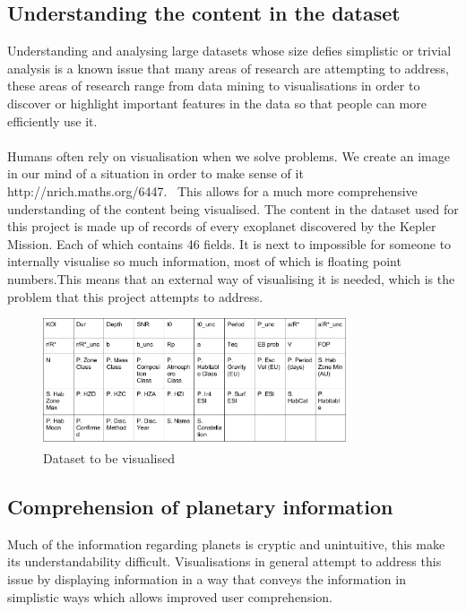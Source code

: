 \subsection{Understanding the content in the dataset}
Understanding and analysing large datasets whose size defies simplistic or trivial analysis is a known issue that many areas of research are attempting to address, these areas of research range from data mining to visualisations in order to discover or highlight important features in the data so that people can more efficiently use it. 
\\\\
Humans often rely on visualisation when we solve problems. We create an image in our mind of a situation in order to make sense of it http://nrich.maths.org/6447.~ This allows for a much more comprehensive understanding of the content being visualised. The content in the dataset used for this project is made up of records of every exoplanet discovered by the Kepler Mission. Each of which contains 46 fields. It is next to impossible for someone to internally visualise so much information, most of which is floating point numbers.This means that an external way of visualising it is needed, which is the problem that this project attempts to address. 
\clearpage
\begin{figure}[h!]
  \centering
      \includegraphics[width=0.8\textwidth]{images/data.png}
  \caption{Dataset to be visualised}
\end{figure}

\subsection{Comprehension of planetary information}
Much of the information regarding planets is cryptic and unintuitive, this make its understandability difficult. Visualisations in general attempt to address this issue by displaying information in a way that conveys the information in simplistic ways which allows improved user comprehension.

